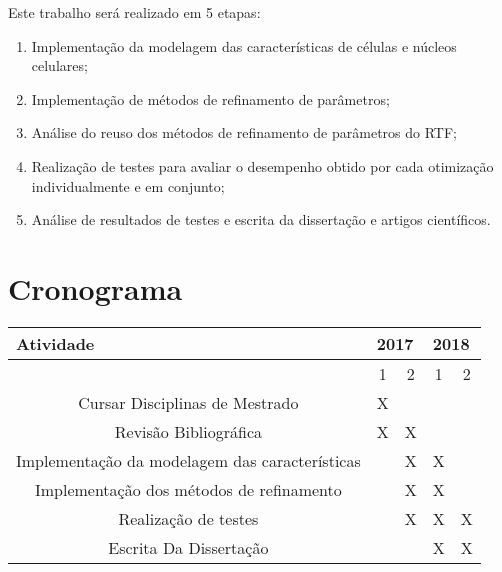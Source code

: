 \documentclass[a4paper,10pt]{article}
\begin{document}
Este trabalho será realizado em 5 etapas:
\begin{enumerate}
	\item Implementação da modelagem das características de células e núcleos celulares;
	\item Implementação de métodos de refinamento de parâmetros;
	\item Análise do reuso dos métodos de refinamento de parâmetros do RTF;
	\item Realização de testes para avaliar o desempenho obtido por cada otimização individualmente e em conjunto;
	\item Análise de resultados de testes e escrita da dissertação e artigos científicos.
\end{enumerate}


\section{Cronograma}
\begin{table}[!h]
	\centering
	\label{my-label}
	\begin{tabular}{|c|c|c|c|c|}
		\hline
		\multicolumn{1}{|l|}{Atividade} & \multicolumn{2}{l|}{2017} & \multicolumn{2}{l|}{2018} \\ \hline
		& 1\degree    & 2\degree    & 1\degree    & 2\degree    \\ \hline
		Cursar Disciplinas de Mestrado  & X           &             &             &             \\ \hline
		Revisão Bibliográfica           & X           & X           &             &             \\ \hline
		Implementação da modelagem das características  &             & X           & X           &             \\ \hline
		Implementação dos métodos de refinamento     &            & X           & X           &             \\ \hline
		Realização de testes     &             & X           & X           &  X          \\ \hline
		Escrita Da Dissertação          &             &             & X           & X           \\ \hline
	\end{tabular}
\end{table}




\newcommand{\BIBdecl}{\setlength{\itemsep}{0.2 em}}
\linespread{0.9}
	

\end{document}
